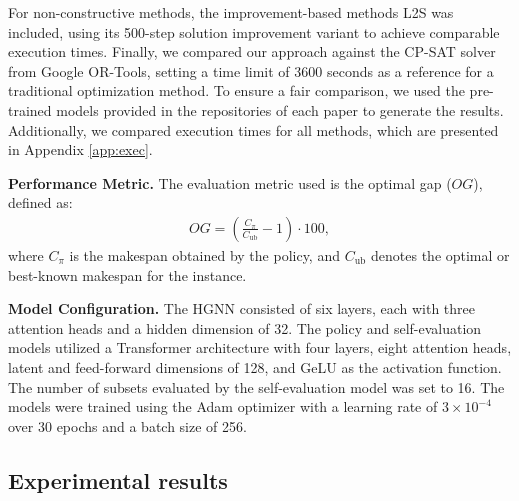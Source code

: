 For non-constructive methods, the improvement-based methods L2S \cite{zhang2024deep} was included, using its 500-step solution improvement variant to achieve comparable execution times. Finally, we compared our approach against the CP-SAT solver from Google OR-Tools, setting a time limit of 3600 seconds as a reference for a traditional optimization method.  
To ensure a fair comparison, we used the pre-trained models provided in the repositories of each paper to generate the results. Additionally, we compared execution times for all methods, which are presented in Appendix \ref{app:exec}.

\textbf{Performance Metric.}  
The evaluation metric used is the optimal gap ($OG$), defined as:
\begin{align}
OG = \left( \frac{C_{\pi}}{C_{\text{ub}}} - 1 \right) \cdot 100,
\end{align}
where $C_{\pi}$ is the makespan obtained by the policy, and $C_{\text{ub}}$ denotes the optimal or best-known makespan for the instance.

\textbf{Model Configuration.}  
The HGNN consisted of six layers, each with three attention heads and a hidden dimension of 32. The policy and self-evaluation models utilized a Transformer architecture with four layers, eight attention heads, latent and feed-forward dimensions of 128, and GeLU as the activation function. The number of subsets evaluated by the self-evaluation model was set to 16. The models were trained using the Adam optimizer with a learning rate of $3 \times 10^{-4}$ over 30 epochs and a batch size of 256.

\subsection{Experimental results}

